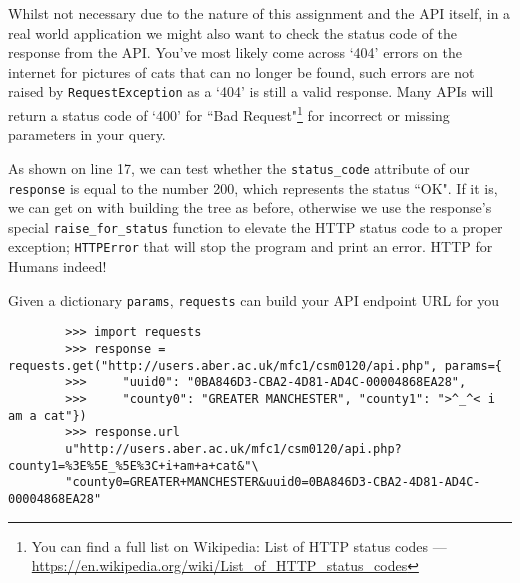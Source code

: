 \documentclass[a4paper]{article}
\begin{document}
Whilst not necessary due to the nature of this assignment and the API itself,
in a real world application we might also want to check
the status code of the response from the API. You've most likely come across `404' errors
on the internet for pictures of cats that can no longer be found, such errors are not raised
by \texttt{RequestException} as a `404' is still a valid response. Many APIs will return a status
code of `400' for ``Bad Request"\footnote{You can
find a full list on Wikipedia: List of HTTP status codes --- {\href{https://en.wikipedia.org/wiki/List\_of\_HTTP\_status\_codes}{https://en.wikipedia.org/wiki/List\_of\_HTTP\_status\_codes}}}
for incorrect or missing parameters in your query.

As shown on line 17, we can test whether the \texttt{status\_code} attribute of our
\texttt{response} is equal to the number 200, which represents the status ``OK".
If it is, we can get on with building the tree as before, otherwise we use the
response's special \texttt{raise\_for\_status} function to elevate the HTTP status
code to a proper exception; \texttt{HTTPError} that will stop the program and print
an error. HTTP for Humans indeed!
\begin{listing}[H]
    \caption[]{Given a dictionary \texttt{params}, \texttt{requests} can build your API endpoint URL for you}
    \label{list:requests_w_params}
    \begin{verbatim}
        >>> import requests
        >>> response = requests.get("http://users.aber.ac.uk/mfc1/csm0120/api.php", params={
        >>>     "uuid0": "0BA846D3-CBA2-4D81-AD4C-00004868EA28",
        >>>     "county0": "GREATER MANCHESTER", "county1": ">^_^< i am a cat"})
        >>> response.url
        u"http://users.aber.ac.uk/mfc1/csm0120/api.php?county1=%3E%5E_%5E%3C+i+am+a+cat&"\
        "county0=GREATER+MANCHESTER&uuid0=0BA846D3-CBA2-4D81-AD4C-00004868EA28"

    \end{verbatim}
\end{listing}
\end{document}
